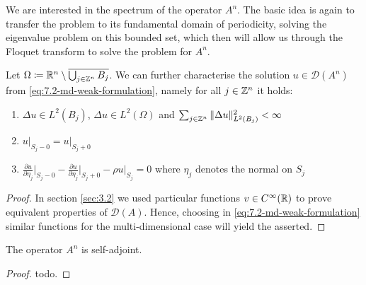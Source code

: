 We are interested in the spectrum of the operator $A^{n}$. The basic idea is again to transfer the problem to its fundamental domain of periodicity, solving the eigenvalue problem on this bounded set, which then will allow us through the Floquet transform to solve the problem for $A^{n}$.

\begin{theorem} Let $\Omega \coloneqq \mathbb{R}^{n} \setminus \overline{\bigcup_{j \in \mathbb{Z}^{n}} B_{j}}$. We can further characterise the solution $u \in \mathcal{D}(A^{n})$ from \eqref{eq:7.2-md-weak-formulation}, namely for all $j \in \mathbb{Z}^{n}$ it holds:
	\begin{enumerate} %
		\item $\Delta u \in L^{2}(B_{j})$, $\Delta u \in L^{2}(\Omega)$ and $\sum_{j \in \mathbb{Z}^{n}} \|\Delta u \|_{L^{2}(B_{j})}^{2} < \infty$
		\item $u \big|_{S_{j} - 0} = u \big|_{S_{j} + 0}$
		\item $\frac{\partial u}{\partial \eta_{j}} \big|_{S_{j} - 0} - \frac{\partial u}{\partial \eta_{j}} \big|_{S_{j} + 0} - \rho u \big|_{S_{j}} = 0$ where $\eta_{j}$ denotes the normal on $S_{j}$
	\end{enumerate}
	
	\begin{proof}
 		In section \ref{sec:3.2} we used particular functions $v \in C^{\infty}(\mathbb{R})$ to prove equivalent properties of $\mathcal{D}(A)$. Hence, choosing in \eqref{eq:7.2-md-weak-formulation} similar functions for the multi-dimensional case will yield the asserted. 
	\end{proof}
\end{theorem}

\begin{remark}
	The operator $A^{n}$ is self-adjoint.	
\end{remark}

\begin{proof}
	todo.
\end{proof}

